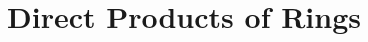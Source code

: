 \section{Direct Products of Rings}

\begin{exercise}
    \td \\
\end{exercise}

\begin{solution}
    \td \\
\end{solution}

\begin{exercise}
    \td \\
\end{exercise}

\begin{solution}
    \td \\
\end{solution}